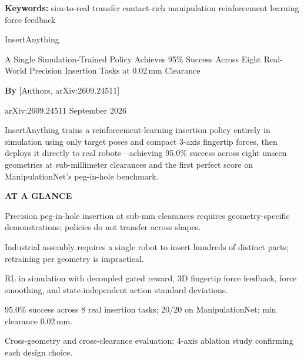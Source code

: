 \documentclass[10pt,twocolumn]{article}
\begin{document}
\setlength{\parindent}{0pt}
\setlength{\parskip}{4pt}

{\small\color{keywordgray}\textbf{Keywords:}
  sim-to-real transfer \textbullet{}
  contact-rich manipulation \textbullet{}
  reinforcement learning \textbullet{}
  force feedback}\par\vspace{4pt}

{\LARGE\bfseries\raggedright
  InsertAnything}\par\vspace{4pt}

{\large\itshape\raggedright
  A Single Simulation-Trained Policy Achieves 95\% Success Across Eight
  Real-World Precision Insertion Tasks at 0.02\,mm Clearance}\par\vspace{6pt}

{\small\textbf{By} [Authors, arXiv:2609.24511]}\par\vspace{2pt}

{\small\color{keywordgray}arXiv:2609.24511 \textbullet{} September 2026}
\par\vspace{2pt}\noindent{\color{rulered}\rule{\columnwidth}{0.6pt}}\vspace{6pt}

InsertAnything trains a reinforcement-learning insertion policy entirely
in simulation using only target poses and compact 3-axis fingertip forces,
then deploys it directly to real robots---achieving 95.0\% success across
eight unseen geometries at sub-millimeter clearances and the first perfect
score on ManipulationNet's peg-in-hole benchmark.

\begin{mdframed}[backgroundcolor=boxgray,linecolor=rulered,linewidth=1pt,
    innerleftmargin=6pt,innerrightmargin=6pt,
    innertopmargin=6pt,innerbottommargin=6pt]
\textbf{\small AT A GLANCE}\par\vspace{4pt}
\begin{description}[leftmargin=0pt,labelsep=4pt,itemsep=2pt,parsep=0pt,
    font=\small\bfseries]
  \item[Problem:] Precision peg-in-hole insertion at sub-mm clearances
    requires geometry-specific demonstrations; policies do not transfer
    across shapes.
  \item[Why it matters:] Industrial assembly requires a single robot to
    insert hundreds of distinct parts; retraining per geometry is
    impractical.
  \item[Method:] RL in simulation with decoupled gated reward, 3D
    fingertip force feedback, force smoothing, and state-independent
    action standard deviations.
  \item[Result:] 95.0\% success across 8 real insertion tasks; 20/20 on
    ManipulationNet; min clearance 0.02\,mm.
  \item[Evidence:] Cross-geometry and cross-clearance evaluation;
    4-axis ablation study confirming each design choice.
\end{description}
\end{mdframed}
\end{document}
